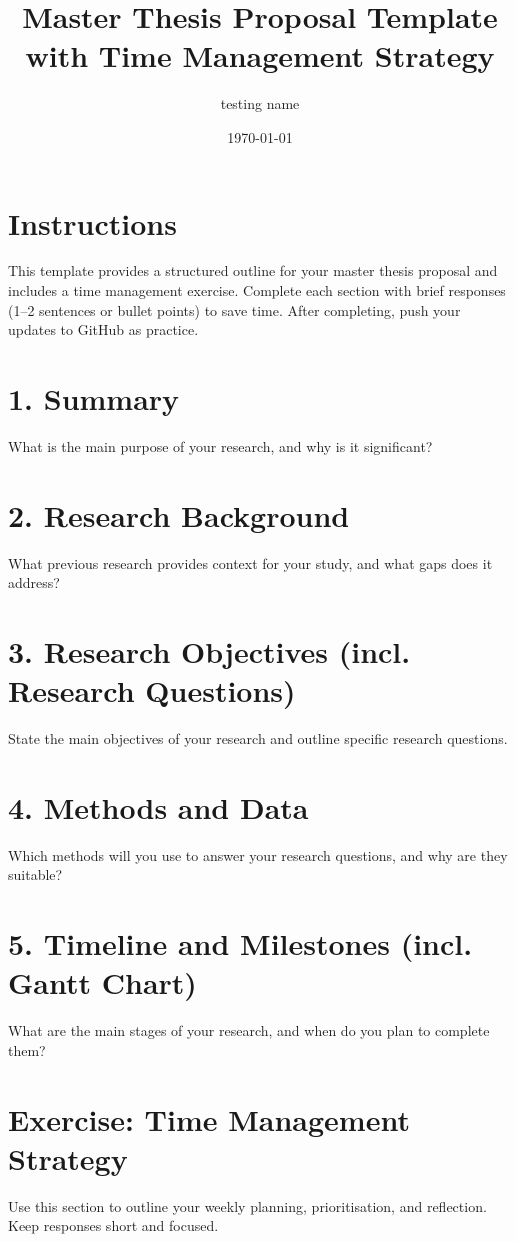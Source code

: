 \documentclass[a4paper,12pt]{article}
\title{Master Thesis Proposal Template with Time Management Strategy}
\author{testing name}
\date{\today}
\begin{document}
\maketitle

\section*{Instructions}
This template provides a structured outline for your master thesis proposal and includes a time management exercise. Complete each section with brief responses (1–2 sentences or bullet points) to save time. After completing, push your updates to GitHub as practice.

\section{1. Summary}
What is the main purpose of your research, and why is it significant?\\

\section{2. Research Background}
What previous research provides context for your study, and what gaps does it address?\\

\section{3. Research Objectives (incl. Research Questions)}
State the main objectives of your research and outline specific research questions.


\section{4. Methods and Data}
Which methods will you use to answer your research questions, and why are they suitable?\\

\section{5. Timeline and Milestones (incl. Gantt Chart)}
What are the main stages of your research, and when do you plan to complete them?\\

\section{Exercise: Time Management Strategy}
Use this section to outline your weekly planning, prioritisation, and reflection. Keep responses short and focused.
\end{document}
